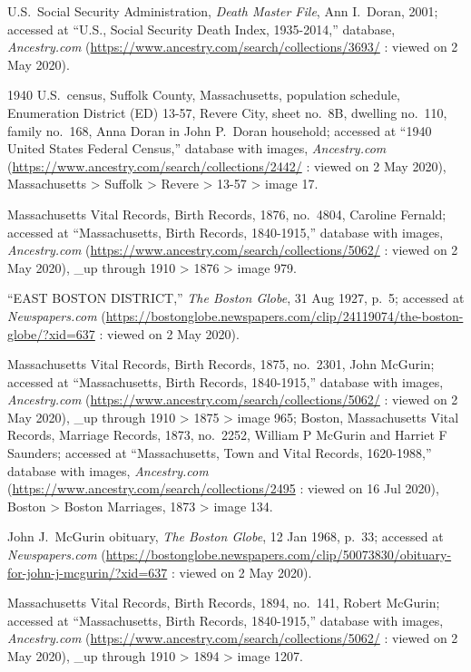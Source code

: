 \begin{thebibliography}{999}
U.S.\ Social Security Administration, \textit{Death Master File}, Ann I.\ Doran, 2001; accessed at ``U.S., Social Security Death Index, 1935-2014,'' database, \textit{Ancestry.com} (\url{https://www.ancestry.com/search/collections/3693/} : viewed on 2 May 2020).

1940 U.S.\ census, Suffolk County, Massachusetts, population schedule, Enumeration District (ED) 13-57, Revere City, sheet no.\ 8B, dwelling no.\ 110, family no.\ 168, Anna Doran in John P.\ Doran household; accessed at ``1940 United States Federal Census,'' database with images, \textit{Ancestry.com} (\url{https://www.ancestry.com/search/collections/2442/} : viewed on 2 May 2020), Massachusetts > Suffolk > Revere > 13-57 > image 17.


Massachusetts Vital Records, Birth Records, 1876, no.\ 4804, Caroline Fernald; accessed at ``Massachusetts, Birth Records, 1840-1915,'' database with images, \textit{Ancestry.com} (\url{https://www.ancestry.com/search/collections/5062/} : viewed on 2 May 2020), \_up through 1910 > 1876 > image 979.

``EAST BOSTON DISTRICT,'' \textit{The Boston Globe}, 31 Aug 1927, p.\ 5; accessed at \textit{Newspapers.com} (\url{https://bostonglobe.newspapers.com/clip/24119074/the-boston-globe/?xid=637} : viewed on 2 May 2020).

Massachusetts Vital Records, Birth Records, 1875, no.\ 2301, John McGurin; accessed at ``Massachusetts, Birth Records, 1840-1915,'' database with images, \textit{Ancestry.com} (\url{https://www.ancestry.com/search/collections/5062/} : viewed on 2 May 2020), \_up through 1910 > 1875 > image 965; Boston, Massachusetts Vital Records, Marriage Records, 1873, no.\ 2252, William P McGurin and Harriet F Saunders; accessed at ``Massachusetts, Town and Vital Records, 1620-1988,'' database with images, \textit{Ancestry.com} (\url{https://www.ancestry.com/search/collections/2495} : viewed on 16 Jul 2020), Boston > Boston Marriages, 1873 > image 134.

John J.\ McGurin obituary, \textit{The Boston Globe}, 12 Jan 1968, p.\ 33; accessed at \textit{Newspapers.com} (\url{https://bostonglobe.newspapers.com/clip/50073830/obituary-for-john-j-mcgurin/?xid=637} : viewed on 2 May 2020).

Massachusetts Vital Records, Birth Records, 1894, no.\ 141, Robert McGurin; accessed at ``Massachusetts, Birth Records, 1840-1915,'' database with images, \textit{Ancestry.com} (\url{https://www.ancestry.com/search/collections/5062/} : viewed on 2 May 2020), \_up through 1910 > 1894 > image 1207.


\end{thebibliography}
